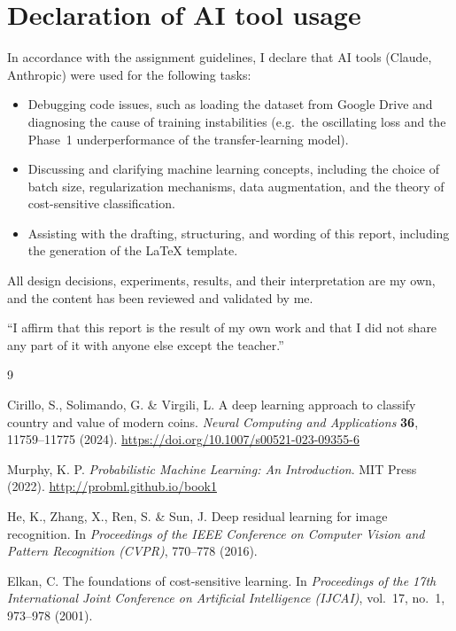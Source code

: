 \documentclass[11pt,a4paper]{article}
\begin{document}
\section*{Declaration of AI tool usage}

In accordance with the assignment guidelines, I declare that AI tools (Claude, Anthropic)
were used for the following tasks:
\begin{itemize}
  \item Debugging code issues, such as loading the dataset from Google Drive and
  diagnosing the cause of training instabilities (e.g.\ the oscillating loss and the
  Phase~1 underperformance of the transfer-learning model).
  \item Discussing and clarifying machine learning concepts, including the choice of
  batch size, regularization mechanisms, data augmentation, and the theory of
  cost-sensitive classification.
  \item Assisting with the drafting, structuring, and wording of this report, including
  the generation of the \LaTeX{} template.
\end{itemize}
All design decisions, experiments, results, and their interpretation are my own, and the
content has been reviewed and validated by me.

\vspace{1em}

\noindent ``I affirm that this report is the result of my own work and that I did not
share any part of it with anyone else except the teacher.''

\begin{thebibliography}{9}
 
Cirillo, S., Solimando, G. \& Virgili, L.
\newblock A deep learning approach to classify country and value of modern coins.
\newblock \emph{Neural Computing and Applications} \textbf{36}, 11759--11775 (2024).
\newblock \url{https://doi.org/10.1007/s00521-023-09355-6}
 
Murphy, K. P.
\newblock \emph{Probabilistic Machine Learning: An Introduction}.
\newblock MIT Press (2022).
\newblock \url{http://probml.github.io/book1}

He, K., Zhang, X., Ren, S. \& Sun, J.
\newblock Deep residual learning for image recognition.
\newblock In \emph{Proceedings of the IEEE Conference on Computer Vision and Pattern
Recognition (CVPR)}, 770--778 (2016).

Elkan, C.
\newblock The foundations of cost-sensitive learning.
\newblock In \emph{Proceedings of the 17th International Joint Conference on Artificial
Intelligence (IJCAI)}, vol.~17, no.~1, 973--978 (2001).
 
\end{thebibliography}
\end{document}
